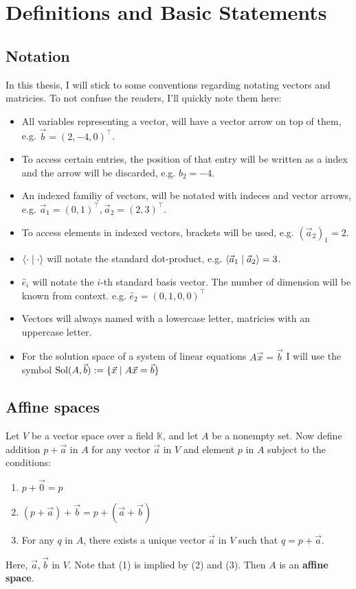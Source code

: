\section{Definitions and Basic Statements}
\subsection{Notation}
In this thesis, I will stick to some conventions regarding notating vectors and matricies. To not confuse the readers, I'll quickly note them here:
\begin{itemize}
    \item All variables representing a vector, will have a vector arrow on top of them, e.g. $\vec b = (2, -4, 0)^\top$.
    \item To access certain entries, the position of that entry will be written as a index and the arrow will be discarded, e.g. $b_2 = -4$.
    \item An indexed familiy of vectors, will be notated with indeces and vector arrows, e.g. $\vec a_1 = (0, 1)^\top, \vec a_2 = (2, 3)^\top$.
    \item To access elements in indexed vectors, brackets will be used, e.g. $(\vec a_2)_1 = 2$.
    \item $\langle \cdot \mid \cdot \rangle$ will notate the standard dot-product, e.g. $\langle \vec a_1 \mid \vec a_2 \rangle = 3$.
    \item $\hat e_i$ will notate the $i$-th standard basis vector. The number of dimension will be known from context. e.g. $\hat e_2 = (0, 1, 0, 0)^\top$
    \item Vectors will always named with a lowercase letter, matricies with an uppercase letter.
    \item For the solution space of a system of linear equations $A\vec x = \vec b$ I will use the symbol $\operatorname{Sol}(A, \vec b) := \{\vec x\mid A\vec x = \vec b\}$
\end{itemize}
\subsection{Affine spaces}
\begin{definition}
    Let $V$ be a vector space over a field $\mathbb{K}$, and let $A$ be a nonempty set. Now define addition $p+\vec a$ in $A$ for any vector $\vec a$ in $V$ and element $p$ in $A$ subject to the conditions:
    \begin{enumerate}
        \item $p + \vec0 = p$
        \item $(p+\vec a)+\vec b=p+(\vec a+\vec b)$
        \item For any $q$ in $A$, there exists a unique vector $\vec a$ in $V$ such that $q=p+\vec a$.
    \end{enumerate}
    Here, $\vec a, \vec b$ in $V$. Note that (1) is implied by (2) and (3). Then $A$ is an \textbf{affine space}.
\end{definition}

